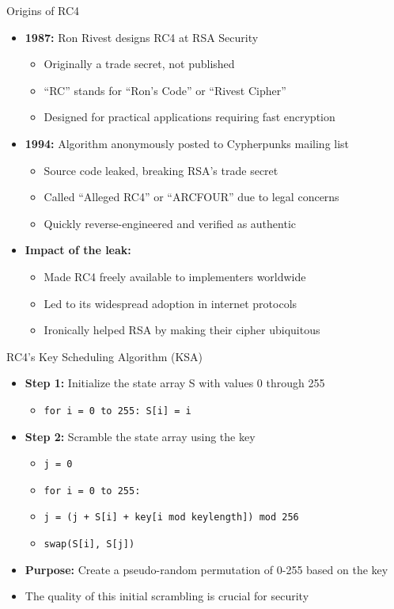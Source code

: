 \documentclass[aspectratio=169, lualatex, handout]{beamer}
\begin{document}
\begin{frame}{Origins of RC4}
	\begin{itemize}
		\item \textbf{1987:} Ron Rivest designs RC4 at RSA Security
		      \begin{itemize}
			      \item Originally a trade secret, not published
			      \item ``RC'' stands for ``Ron's Code'' or ``Rivest Cipher''
			      \item Designed for practical applications requiring fast encryption
		      \end{itemize}
		\item \textbf{1994:} Algorithm anonymously posted to Cypherpunks mailing list
		      \begin{itemize}
			      \item Source code leaked, breaking RSA's trade secret
			      \item Called ``Alleged RC4'' or ``ARCFOUR'' due to legal concerns
			      \item Quickly reverse-engineered and verified as authentic
		      \end{itemize}
		\item \textbf{Impact of the leak:}
		      \begin{itemize}
			      \item Made RC4 freely available to implementers worldwide
			      \item Led to its widespread adoption in internet protocols
			      \item Ironically helped RSA by making their cipher ubiquitous
		      \end{itemize}
	\end{itemize}
\end{frame}

\begin{frame}{RC4's Key Scheduling Algorithm (KSA)}
	\begin{itemize}
		\item \textbf{Step 1:} Initialize the state array S with values 0 through 255
		      \begin{itemize}
			      \item \texttt{for i = 0 to 255: S[i] = i}
		      \end{itemize}
		\item \textbf{Step 2:} Scramble the state array using the key
		      \begin{itemize}
			      \item \texttt{j = 0}
			      \item \texttt{for i = 0 to 255:}
			      \item \texttt{\quad j = (j + S[i] + key[i mod keylength]) mod 256}
			      \item \texttt{\quad swap(S[i], S[j])}
		      \end{itemize}
		\item \textbf{Purpose:} Create a pseudo-random permutation of 0-255 based on the key
		\item The quality of this initial scrambling is crucial for security
	\end{itemize}
\end{frame}
\end{document}

